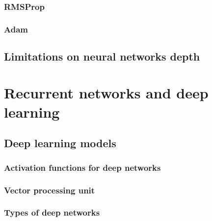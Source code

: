 \subsubsection{RMSProp}

\subsubsection{Adam}

\subsection{Limitations on neural networks depth}


\section{Recurrent networks and deep learning}

\subsection{Deep learning models}
\subsubsection{Activation functions for deep networks}
\subsubsection{Vector processing unit}
\subsubsection{Types of deep networks}

